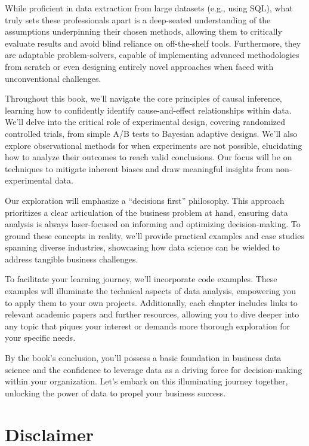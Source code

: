 \documentclass[
  letterpaper,
  DIV=11,
  numbers=noendperiod]{scrreprt}
\begin{document}
While proficient in data extraction from large datasets (e.g., using
SQL), what truly sets these professionals apart is a deep-seated
understanding of the assumptions underpinning their chosen methods,
allowing them to critically evaluate results and avoid blind reliance on
off-the-shelf tools. Furthermore, they are adaptable problem-solvers,
capable of implementing advanced methodologies from scratch or even
designing entirely novel approaches when faced with unconventional
challenges.

Throughout this book, we'll navigate the core principles of causal
inference, learning how to confidently identify cause-and-effect
relationships within data. We'll delve into the critical role of
experimental design, covering randomized controlled trials, from simple
A/B tests to Bayesian adaptive designs. We'll also explore observational
methods for when experiments are not possible, elucidating how to
analyze their outcomes to reach valid conclusions. Our focus will be on
techniques to mitigate inherent biases and draw meaningful insights from
non-experimental data.

Our exploration will emphasize a ``decisions first'' philosophy. This
approach prioritizes a clear articulation of the business problem at
hand, ensuring data analysis is always laser-focused on informing and
optimizing decision-making. To ground these concepts in reality, we'll
provide practical examples and case studies spanning diverse industries,
showcasing how data science can be wielded to address tangible business
challenges.

To facilitate your learning journey, we'll incorporate code examples.
These examples will illuminate the technical aspects of data analysis,
empowering you to apply them to your own projects. Additionally, each
chapter includes links to relevant academic papers and further
resources, allowing you to dive deeper into any topic that piques your
interest or demands more thorough exploration for your specific needs.

By the book's conclusion, you'll possess a basic foundation in business
data science and the confidence to leverage data as a driving force for
decision-making within your organization. Let's embark on this
illuminating journey together, unlocking the power of data to propel
your business success.

\section*{Disclaimer}\label{disclaimer}
\end{document}
